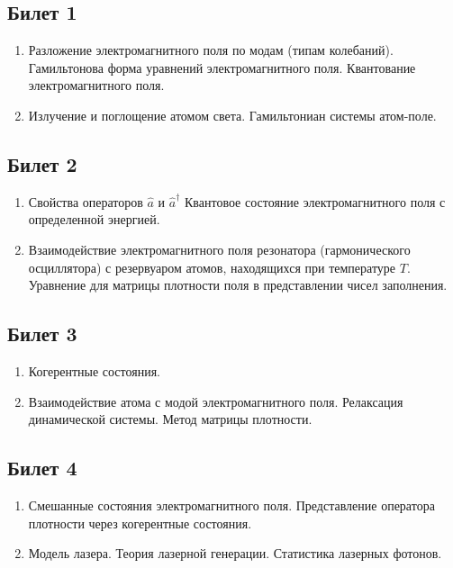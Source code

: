 


\Russian


\subsection*{Билет 1} 
\begin{enumerate}
\item Разложение электромагнитного поля по модам (типам колебаний).
Гамильтонова форма уравнений электромагнитного поля.
Квантование электромагнитного поля. 
\item Излучение и поглощение атомом света.
Гамильтониан системы атом-поле.
\end{enumerate}

\subsection*{Билет 2} 
\begin{enumerate}
\item Свойства операторов $ \hat a $ и $ \hat a ^\dag $ 
Квантовое состояние электромагнитного поля  с определенной
  энергией. 
\item Взаимодействие электромагнитного поля резонатора
(гармонического осциллятора) с резервуаром атомов, находящихся при
температуре $T$.
Уравнение для матрицы плотности поля в представлении чисел
заполнения.
\end{enumerate}

\subsection*{Билет 3} 
\begin{enumerate}
\item Когерентные состояния. 
\item Взаимодействие атома с модой электромагнитного поля.
Релаксация динамической системы. Метод матрицы плотности.
\end{enumerate}

\subsection*{Билет 4} 
\begin{enumerate}
\item Смешанные состояния электромагнитного поля.
Представление оператора плотности через когерентные
состояния. 
\item Модель лазера. Теория лазерной генерации. Статистика лазерных
фотонов. 
\end{enumerate}

